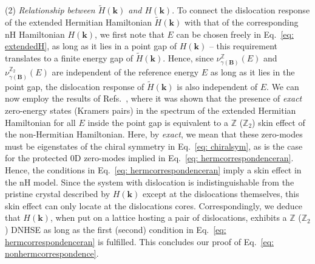 \documentclass[prb,reprint,twocolumn,preprintnumbers,amsmath,amssymb,showpacs,nofootinbib,superscriptaddress]{revtex4-2}
\newcommand{\bs}[1]{\boldsymbol{#1}}
\begin{document}
(2) \emph{Relationship between $\tilde{H}(\bs{k})$ and $H(\bs{k})$}. To connect the dislocation response of the extended Hermitian Hamiltonian $\tilde{H}(\bs{k})$ with that of the corresponding nH Hamiltonian $H(\bs{k})$, we first note that $E$ can be chosen freely in Eq.~\eqref{eq: extendedH}, as long as it lies in a point gap of $H(\bs{k})$ -- this requirement translates to a finite energy gap of $\tilde{H}(\bs{k})$. Hence, since $\nu^{\mathbb{Z}}_{\gamma(\bs{B})}(E)$ and $\nu^{\mathbb{Z}_2}_{\gamma(\bs{B})}(E)$ are independent of the reference energy $E$ as long as it lies in the point gap, the dislocation response of $\tilde{H}(\bs{k})$ is also independent of $E$. We can now employ the results of Refs.~, where it was shown that the presence of \emph{exact} zero-energy states (Kramers pairs) in the spectrum of the extended Hermitian Hamiltonian for all $E$ inside the point gap is equivalent to a $\mathbb{Z}$ ($\mathbb{Z}_2$) skin effect of the non-Hermitian Hamiltonian. Here, by \emph{exact}, we mean that these zero-modes must be eigenstates of the chiral symmetry in Eq.~\eqref{eq: chiralsym}, as is the case for the protected 0D zero-modes implied in Eq.~\eqref{eq: hermcorrespondenceran}. Hence, the conditions in Eq.~\eqref{eq: hermcorrespondenceran} imply a skin effect in the nH model. Since the system with dislocation is indistinguishable from the pristine crystal described by $H(\bs{k})$ except at the dislocations themselves, this skin effect can only locate at the dislocations cores. Correspondingly, we deduce that $H(\bs{k})$, when put on a lattice hosting a pair of dislocations, exhibits a $\mathbb{Z}$ ($\mathbb{Z}_2$) DNHSE as long as the first (second) condition in Eq.~\eqref{eq: hermcorrespondenceran} is fulfilled. This concludes our proof of Eq.~\eqref{eq: nonhermcorrespondence}.





\end{document}
